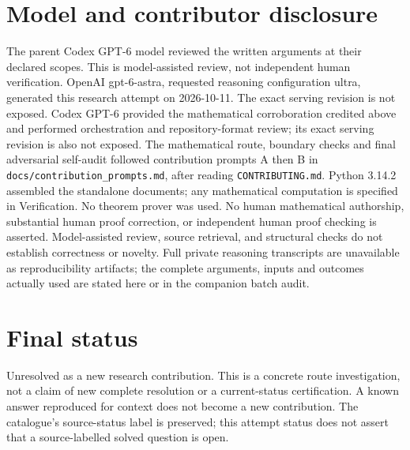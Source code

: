 \documentclass[11pt]{article}
\begin{document}
\section{Model and contributor disclosure}
The parent Codex GPT-6 model reviewed the written arguments at their declared scopes. This is model-assisted review, not independent human verification.
OpenAI gpt-6-astra, requested reasoning configuration ultra, generated this research
attempt on 2026-10-11. The exact serving revision is not exposed. Codex GPT-6
provided the mathematical corroboration credited above and performed orchestration and repository-format review; its exact serving revision
is also not exposed. The mathematical route, boundary checks and final adversarial
self-audit followed contribution prompts A then B in
\texttt{docs/contribution\_prompts.md}, after reading \texttt{CONTRIBUTING.md}.
Python 3.14.2 assembled the standalone documents; any mathematical computation is
specified in Verification. No theorem prover was used. No human mathematical
authorship, substantial human proof correction, or independent human proof checking
is asserted. Model-assisted review, source retrieval, and structural checks do not
establish correctness or novelty. Full private reasoning transcripts are unavailable
as reproducibility artifacts; the complete arguments, inputs and outcomes actually
used are stated here or in the companion batch audit.
\section{Final status}
Unresolved as a new research contribution. This is a concrete route investigation,
not a claim of new complete resolution or a current-status certification. A known
answer reproduced for context does not become a new contribution. The catalogue's
source-status label is preserved; this attempt status does not assert that a
source-labelled solved question is open.
\end{document}
